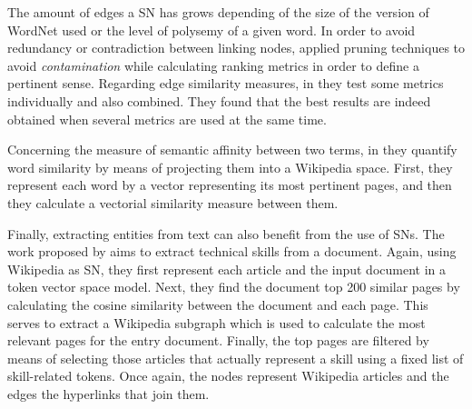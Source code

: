 The amount of edges a SN has grows depending of the size of the version of WordNet used or the level of polysemy of a given word. In order to avoid redundancy or contradiction between  linking nodes, \cite{2004.Mihalcea.SemanticNetworkPageRank,2007.Navigli.GraphConnectivity} applied pruning techniques to avoid \textit{contamination} while calculating ranking metrics in order to define a pertinent sense. Regarding edge similarity measures,  in  \cite{2007.Sinha.Mihalcea.Unsupervised, 2007.Tsatsaronis.WSDwithSpreading} they test some metrics individually and also combined. They found that the best results are indeed obtained when several metrics are used at the same time.


Concerning the measure of semantic affinity between two terms, in \cite{2009.Yeh.Wikiwalk} they quantify word similarity by means of projecting them into a Wikipedia space. First, they represent each word by a vector representing its most pertinent pages,  and then they calculate a vectorial similarity measure between them.




Finally, extracting entities from text can also benefit from the use of SNs. The work proposed by  \cite{2013.Kivimaki.AGraph-BasedApproach} aims to extract technical skills from a document. Again, using Wikipedia as SN, they first represent each article and the input document in a token vector space model.  Next, they find the document top 200 similar pages by calculating the cosine similarity between the document and each page. This serves to extract a Wikipedia subgraph which is used to calculate the most relevant pages for the entry document. Finally, the top pages are filtered by means of selecting those articles that actually represent a skill using a fixed list of skill-related tokens. Once again, the nodes represent Wikipedia articles and the edges the hyperlinks that join them.


